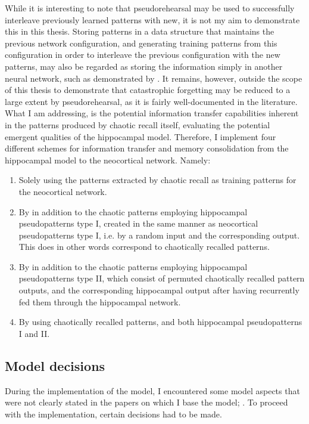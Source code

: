 While it is interesting to note that pseudorehearsal may be used to successfully interleave previously learned patterns with new, it is not my aim to demonstrate this in this thesis.
Storing patterns in a data structure that maintains the previous network configuration, and generating training patterns from this configuration in order to interleave the previous configuration with the new patterns, may also be regarded as storing the information simply in another neural network, such as demonstrated by \cite{French1997}. It remains, however, outside the scope of this thesis to demonstrate that catastrophic forgetting may be reduced to a large extent by pseudorehearsal, as it is fairly well-documented in the literature. 
What I am addressing, is the potential information transfer capabilities inherent in the patterns produced by chaotic recall itself, evaluating the potential emergent qualities of the hippocampal model. Therefore, I implement four different schemes for information transfer and memory consolidation from the hippocampal model to the neocortical network. Namely:

\begin{enumerate}
    \item Solely using the patterns extracted by chaotic recall as training patterns for the neocortical network.
    \item By in addition to the chaotic patterns employing hippocampal pseudopatterns type I, created in the same manner as neocortical pseudopatterns type I, i.e. by a random input and the corresponding output. This does in other words correspond to chaotically recalled patterns.
    \item By in addition to the chaotic patterns employing hippocampal pseudopatterns type II, which consist of permuted chaotically recalled pattern outputs, and the corresponding hippocampal output after having recurrently fed them through the hippocampal network.
    \item By using chaotically recalled patterns, and both hippocampal pseudopatterns I and II.
\end{enumerate}


\subsection{Model decisions}

During the implementation of the model, I encountered some model aspects that were not clearly stated in the papers on which I base the model; \citep{Hattori2014, Hattori2010}. To proceed with the implementation, certain decisions had to be made.


